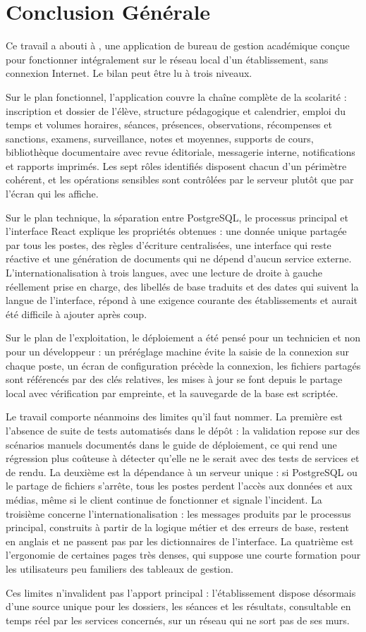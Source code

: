 \chapter*{Conclusion Générale}

Ce travail a abouti à \appname, une application de bureau de gestion académique conçue pour fonctionner
intégralement sur le réseau local d'un établissement, sans connexion Internet. Le bilan peut être lu à
trois niveaux.

Sur le plan fonctionnel, l'application couvre la chaîne complète de la scolarité : inscription et dossier
de l'élève, structure pédagogique et calendrier, emploi du temps et volumes horaires, séances,
présences, observations, récompenses et sanctions, examens, surveillance, notes et moyennes, supports de
cours, bibliothèque documentaire avec revue éditoriale, messagerie interne, notifications et rapports
imprimés. Les sept rôles identifiés disposent
chacun d'un périmètre cohérent, et les opérations sensibles sont contrôlées par le serveur plutôt que par
l'écran qui les affiche.

Sur le plan technique, la séparation entre PostgreSQL, le processus principal et l'interface React
explique les propriétés obtenues : une donnée unique partagée par tous les postes, des règles
d'écriture centralisées, une interface qui reste réactive et une génération de documents qui ne dépend
d'aucun service externe. L'internationalisation à trois langues, avec une lecture de droite à gauche
réellement prise en charge, des libellés de base traduits et des dates qui suivent la langue de
l'interface, répond à une exigence courante des établissements et aurait été difficile à ajouter après
coup.

Sur le plan de l'exploitation, le déploiement a été pensé pour un technicien et non pour un
développeur : un préréglage machine évite la saisie de la connexion sur chaque poste, un écran de
configuration précède la connexion, les fichiers partagés sont référencés par des clés relatives, les
mises à jour se font depuis le partage local avec vérification par empreinte, et la sauvegarde de la
base est scriptée.

Le travail comporte néanmoins des limites qu'il faut nommer. La première est l'absence de suite de
tests automatisés dans le dépôt : la validation repose sur des scénarios manuels documentés dans le
guide de déploiement, ce qui rend une régression plus coûteuse à détecter qu'elle ne le serait avec des
tests de services et de rendu. La deuxième est la dépendance à un serveur unique : si PostgreSQL ou le
partage de fichiers s'arrête, tous les postes perdent l'accès aux données et aux médias, même si le
client continue de fonctionner et signale l'incident. La troisième concerne l'internationalisation :
les messages produits par le processus principal, construits à partir de la logique métier et des
erreurs de base, restent en anglais et ne passent pas par les dictionnaires de l'interface. La
quatrième est l'ergonomie de certaines pages très denses, qui suppose une courte formation pour les
utilisateurs peu familiers des tableaux de gestion.

Ces limites n'invalident pas l'apport principal : l'établissement dispose désormais d'une source unique
pour les dossiers, les séances et les résultats, consultable en temps réel par les services concernés,
sur un réseau qui ne sort pas de ses murs.
